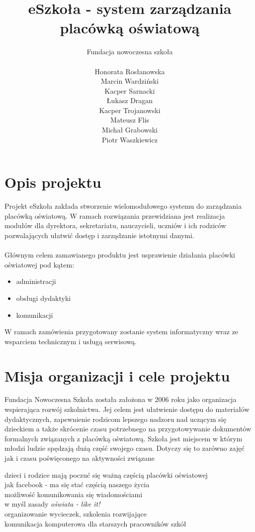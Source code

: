 \documentclass{article}
\author{Fundacja nowoczesna szkoła\\\\
Honorata Rosłanowska \\
Marcin Wardziński\\
Kacper Sarnacki \\
Łukasz Dragan \\
Kacper Trojanowski \\
Mateusz Flis \\
Michał Grabowski \\
Piotr Waszkiewicz}
\title{eSzkoła - system zarządzania placówką oświatową}
\begin{document}
\maketitle
\newpage
\tableofcontents
\newpage

\section{Opis projektu}
Projekt eSzkoła zakłada stworzenie wielomodułowego systemu do zarządzania placówką oświatową. W ramach rozwiązania przewidziana jest realizacja modułów dla dyrektora, sekretariatu, nauczycieli, uczniów i ich rodziców pozwalających ułatwić dostęp i zarządzanie istotnymi danymi. \\ \\
Głównym celem zamawianego produktu jest usprawienie działania placówki oświatowej pod kątem:
\begin{itemize}
    \item administracji
    \item obsługi dydaktyki
    \item komunikacji
\end{itemize}
W ramach zamówienia przygotowany zostanie system informatyczny wraz ze wsparciem technicznym i usługą serwisową.

\section{Misja organizacji i cele projektu}
Fundacja Nowoczesna Szkoła została założona w 2006 roku jako organizacja wspierająca rozwój szkolnictwa. Jej celem jest ułatwienie dostępu do materiałów dydaktycznych, zapewnienie rodzicom lepszego nadzoru nad uczącym się dzieckiem a także skrócenie czasu potrzebnego na przygotowywanie dokumentów formalnych związanych z placówką oświatową. Szkoła jest miejscem w którym młodzi ludzie spędzają dużą część swojego czasu. Dotyczy się to zarówno zajęć jak i czasu poświęconego na aktywności związane 

dzieci i rodzice mają poczuć się ważną częścią placówki oświatowej\\
jak facebook - ma się stać częścią naszego życia\\
możliwość komunikowania się wiadomościami\\
w myśl zasady \textit{ oświata - like it!}\\
organizowanie wycieczek, szkolenia rozwijające \\
komunikacja komputerowa dla starszych pracowników szkół
\end{document}
